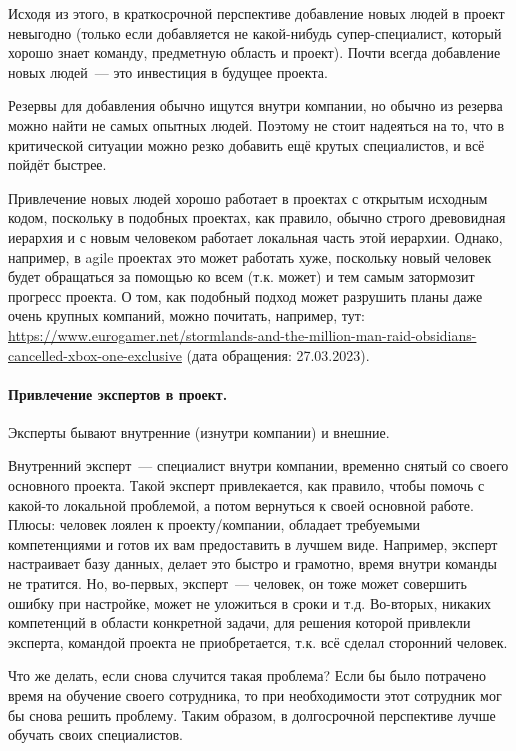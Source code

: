 \documentclass{../../text-style}
\begin{document}
Исходя из этого, в краткосрочной перспективе добавление новых людей в проект невыгодно (только если добавляется не какой-нибудь супер-специалист, который хорошо знает команду, предметную область и проект). Почти всегда добавление новых людей~--- это инвестиция в будущее проекта.

Резервы для добавления обычно ищутся внутри компании, но обычно из резерва можно найти не самых опытных людей. Поэтому не стоит надеяться на то, что в критической ситуации можно резко добавить ещё крутых специалистов, и всё пойдёт быстрее.

Привлечение новых людей хорошо работает в проектах с открытым исходным кодом, поскольку в подобных проектах, как правило, обычно строго древовидная иерархия и с новым человеком работает локальная часть этой иерархии. Однако, например, в agile проектах это может работать хуже, поскольку новый человек будет обращаться за помощью ко всем (т.к. может) и тем самым затормозит прогресс проекта. О том, как подобный подход может разрушить планы даже очень крупных компаний, можно почитать, например, тут: \url{https://www.eurogamer.net/stormlands-and-the-million-man-raid-obsidians-cancelled-xbox-one-exclusive} (дата обращения: 27.03.2023).

\paragraph{Привлечение экспертов в проект.} Эксперты бывают внутренние (изнутри компании) и внешние.

Внутренний эксперт~--- специалист внутри компании, временно снятый со своего основного проекта. Такой эксперт привлекается, как правило, чтобы помочь с какой-то локальной проблемой, а потом вернуться к своей основной работе. Плюсы: человек лоялен к проекту/компании, обладает требуемыми компетенциями и готов их вам предоставить в лучшем виде. Например, эксперт настраивает базу данных, делает это быстро и грамотно, время внутри команды не тратится. Но, во-первых, эксперт~--- человек, он тоже может совершить ошибку при настройке, может не уложиться в сроки и т.д. Во-вторых, никаких компетенций в области конкретной задачи, для решения которой привлекли эксперта, командой проекта не приобретается, т.к. всё сделал сторонний человек.

Что же делать, если снова случится такая проблема? Если бы было потрачено время на обучение своего сотрудника, то при необходимости этот сотрудник мог бы снова решить проблему. Таким образом, в долгосрочной перспективе лучше обучать своих специалистов.
\end{document}
